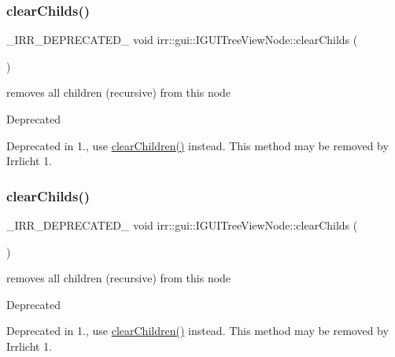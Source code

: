 \subsubsection{\texorpdfstring{clear\+Childs()}{clearChilds()}\hspace{0.1cm}{\footnotesize\ttfamily [1/2]}}
{\footnotesize\ttfamily \+\_\+\+I\+R\+R\+\_\+\+D\+E\+P\+R\+E\+C\+A\+T\+E\+D\+\_\+ void irr\+::gui\+::\+I\+G\+U\+I\+Tree\+View\+Node\+::clear\+Childs (\begin{DoxyParamCaption}{ }\end{DoxyParamCaption})\hspace{0.3cm}{\ttfamily [inline]}}



removes all children (recursive) from this node 

\begin{DoxyRefDesc}{Deprecated}
\item[\hyperlink{deprecated__deprecated000007}{Deprecated}]Deprecated in 1., use \hyperlink{classirr_1_1gui_1_1IGUITreeViewNode_a0bc4702930d1ddb25b895c7176f5f459}{clear\+Children()} instead. This method may be removed by Irrlicht 1. \end{DoxyRefDesc}
\mbox{\label{classirr_1_1gui_1_1IGUITreeViewNode_a6c431404c8e36eb565f033c1e1dce247}} 
\subsubsection{\texorpdfstring{clear\+Childs()}{clearChilds()}\hspace{0.1cm}{\footnotesize\ttfamily [2/2]}}
{\footnotesize\ttfamily \+\_\+\+I\+R\+R\+\_\+\+D\+E\+P\+R\+E\+C\+A\+T\+E\+D\+\_\+ void irr\+::gui\+::\+I\+G\+U\+I\+Tree\+View\+Node\+::clear\+Childs (\begin{DoxyParamCaption}{ }\end{DoxyParamCaption})\hspace{0.3cm}{\ttfamily [inline]}}



removes all children (recursive) from this node 

\begin{DoxyRefDesc}{Deprecated}
\item[\hyperlink{deprecated__deprecated000033}{Deprecated}]Deprecated in 1., use \hyperlink{classirr_1_1gui_1_1IGUITreeViewNode_a0bc4702930d1ddb25b895c7176f5f459}{clear\+Children()} instead. This method may be removed by Irrlicht 1. \end{DoxyRefDesc}
\mbox{\label{classirr_1_1gui_1_1IGUITreeViewNode_a26d0ce5bc0a6e7814f69d68033c30242}} 
